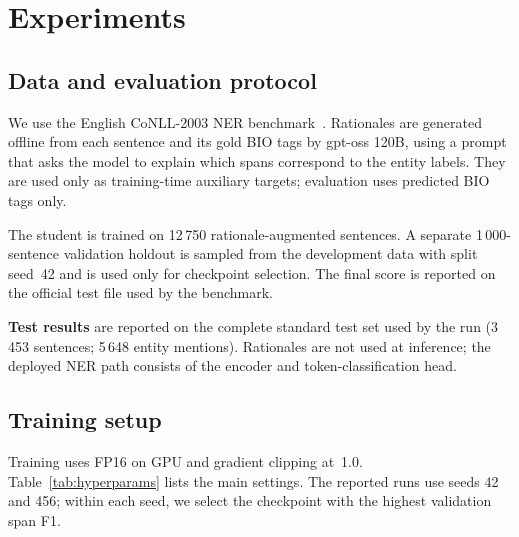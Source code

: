 \documentclass[a4paper,12pt]{extarticle}
\begin{document}
\section{Experiments}
\label{sec:experiments}

\subsection{Data and evaluation protocol}
\label{sec:data-protocol}

We use the English CoNLL-2003 NER benchmark~\cite{tjong2003introduction}. Rationales are generated offline from each sentence and its gold BIO tags by gpt-oss 120B, using a prompt that asks the model to explain which spans correspond to the entity labels. They are used only as training-time auxiliary targets; evaluation uses predicted BIO tags only.

The student is trained on 12\,750 rationale-augmented sentences. A separate 1\,000-sentence validation holdout is sampled from the development data with split seed~42 and is used only for checkpoint selection. The final score is reported on the official test file used by the benchmark.

\textbf{Test results} are reported on the complete standard test set used by the run (3\,453 sentences; 5\,648 entity mentions). Rationales are not used at inference; the deployed NER path consists of the encoder and token-classification head.

\subsection{Training setup}
\label{sec:hyperparams}

Training uses FP16 on GPU and gradient clipping at~1.0. Table~\ref{tab:hyperparams} lists the main settings. The reported runs use seeds 42 and 456; within each seed, we select the checkpoint with the highest validation span F1.
\end{document}
